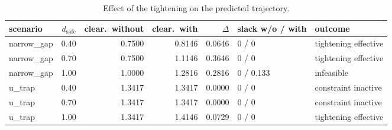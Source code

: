 \begin{table}[htbp]
  \centering
  \small
  \caption{Effect of the tightening on the predicted trajectory.}
  \label{res:tab:robust}
  \begin{tabular}{lrrrrll}
    \toprule
    scenario & $d_{\mathrm{safe}}$ & clear.\ without & clear.\ with & $\Delta$ & slack w/o / with & outcome \\
    \midrule
    narrow\_gap & 0.40 & 0.7500 & 0.8146 & 0.0646 & 0 / 0 & tightening effective \\
    narrow\_gap & 0.70 & 0.7500 & 1.1146 & 0.3646 & 0 / 0 & tightening effective \\
    narrow\_gap & 1.00 & 1.0000 & 1.2816 & 0.2816 & 0 / 0.133 & infeasible \\
    u\_trap & 0.40 & 1.3417 & 1.3417 & 0.0000 & 0 / 0 & constraint inactive \\
    u\_trap & 0.70 & 1.3417 & 1.3417 & 0.0000 & 0 / 0 & constraint inactive \\
    u\_trap & 1.00 & 1.3417 & 1.4146 & 0.0729 & 0 / 0 & tightening effective \\
    \bottomrule
  \end{tabular}
\end{table}

